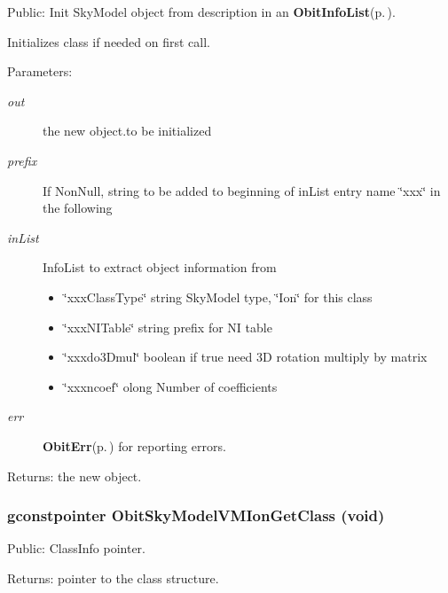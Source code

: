 Public: Init Sky\-Model object from description in an {\bf Obit\-Info\-List}{\rm (p.\,\pageref{structObitInfoList})}. 

Initializes class if needed on first call. \begin{Desc}
\item[Parameters:]
\begin{description}
\item[{\em out}]the new object.to be initialized \item[{\em prefix}]If Non\-Null, string to be added to beginning of in\-List entry name \char`\"{}xxx\char`\"{} in the following \item[{\em in\-List}]Info\-List to extract object information from \begin{itemize}
\item \char`\"{}xxx\-Class\-Type\char`\"{} string Sky\-Model type, \char`\"{}Ion\char`\"{} for this class \item \char`\"{}xxx\-NITable\char`\"{} string prefix for NI table \item \char`\"{}xxxdo3Dmul\char`\"{} boolean if true need 3D rotation multiply by matrix \item \char`\"{}xxxncoef\char`\"{} olong Number of coefficients \end{itemize}
\item[{\em err}]{\bf Obit\-Err}{\rm (p.\,\pageref{structObitErr})} for reporting errors. \end{description}
\end{Desc}
\begin{Desc}
\item[Returns:]the new object. \end{Desc}
\subsubsection{\setlength{\rightskip}{0pt plus 5cm}gconstpointer Obit\-Sky\-Model\-VMIon\-Get\-Class (void)}\label{ObitSkyModelVMIon_8h_a10}


Public: Class\-Info pointer. 

\begin{Desc}
\item[Returns:]pointer to the class structure. \end{Desc}
